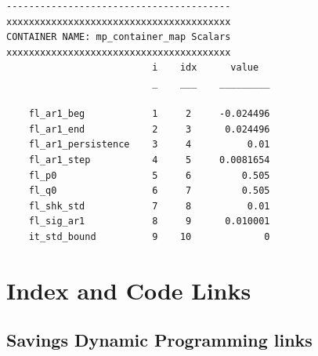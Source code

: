 \documentclass[
]{book}
\begin{document}
\begin{verbatim}
----------------------------------------
xxxxxxxxxxxxxxxxxxxxxxxxxxxxxxxxxxxxxxxx
CONTAINER NAME: mp_container_map Scalars
xxxxxxxxxxxxxxxxxxxxxxxxxxxxxxxxxxxxxxxx
                          i    idx      value  
                          _    ___    _________

    fl_ar1_beg            1     2     -0.024496
    fl_ar1_end            2     3      0.024496
    fl_ar1_persistence    3     4          0.01
    fl_ar1_step           4     5     0.0081654
    fl_p0                 5     6         0.505
    fl_q0                 6     7         0.505
    fl_shk_std            7     8          0.01
    fl_sig_ar1            8     9      0.010001
    it_std_bound          9    10             0
\end{verbatim}

\hypertarget{appendix-appendix}{%
\appendix}


\hypertarget{index-and-code-links}{%
\chapter{Index and Code Links}\label{index-and-code-links}}

\hypertarget{savings-dynamic-programming-links}{%
\section{Savings Dynamic Programming links}\label{savings-dynamic-programming-links}}
\end{document}
